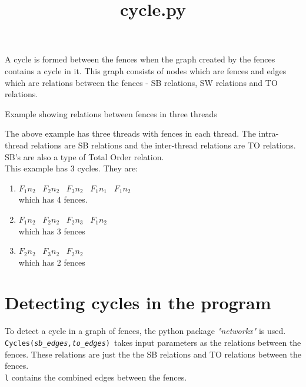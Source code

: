 \documentclass[dvipsnames]{article}
\date{}
\newcommand{\var}[1]{\color{OliveGreen} \texttt{#1}\color{black}}
\newcommand{\fun}[2]{\color{Sepia}\texttt{#1(\color{Gray}\textit{#2}\color{Sepia})}\color{black}}
\begin{document}
\title{cycle.py}
\maketitle

A cycle is formed between the fences when the graph created by the fences contains a cycle in it. This graph consists of nodes which are fences and edges which are relations between the fences - SB relations, SW relations and TO relations.\\
\begin{center}
    
    Example showing relations between fences in three threads
\end{center}
The above example has three threads with fences in each thread. The intra-thread relations are SB relations and the inter-thread relations are TO relations. SB's are also a type of Total Order relation. \\

This example has 3 cycles. They are:\\
\begin{enumerate}
    \item $F_1n_2$ \rightarrow\ $F_2n_2$ \rightarrow\ $F_3n_2$ \rightarrow\ $F_1n_1$ \rightarrow\ $F_1n_2$\\which has 4 fences.
    
    \item $F_1n_2$ \rightarrow\ $F_2n_2$ \rightarrow\ $F_2n_3$ \rightarrow\ $F_1n_2$\\which has 3 fences
    \item $F_2n_2$ \rightarrow\ $F_3n_2$ \rightarrow\ $F_2n_2$\\which has 2 fences
\end{enumerate}

\section{Detecting cycles in the program}
To detect a cycle in a graph of fences, the python package \textit{"networkx"} is used.\\

\fun{Cycles}{sb\_edges,to\_edges}\ takes input parameters as the relations between the fences. These relations are just the the SB relations and TO relations between the fences.\\

\var{l} contains the combined edges between the fences.\\
\end{document}

